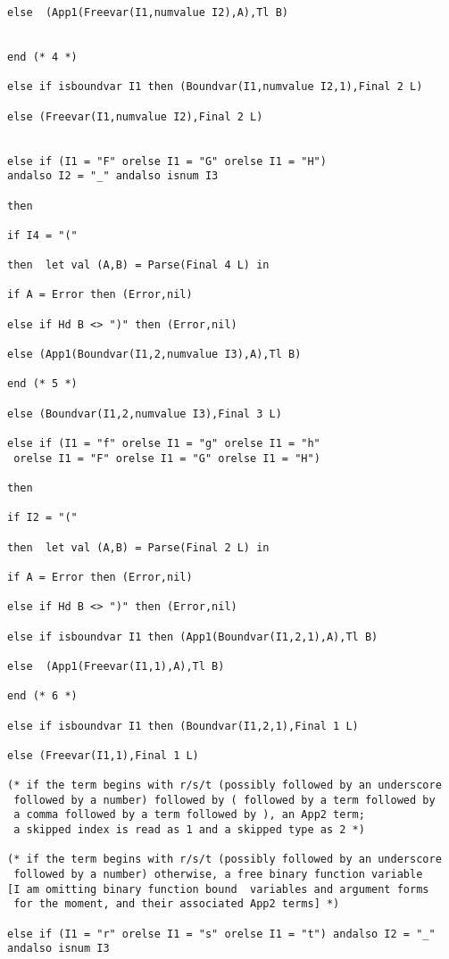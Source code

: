 \documentclass{article}
\begin{document}
{{\begin{verbatim}
else  (App1(Freevar(I1,numvalue I2),A),Tl B)


end (* 4 *)

else if isboundvar I1 then (Boundvar(I1,numvalue I2,1),Final 2 L)

else (Freevar(I1,numvalue I2),Final 2 L)


else if (I1 = "F" orelse I1 = "G" orelse I1 = "H") 
andalso I2 = "_" andalso isnum I3

then

if I4 = "("

then  let val (A,B) = Parse(Final 4 L) in

if A = Error then (Error,nil)

else if Hd B <> ")" then (Error,nil)

else (App1(Boundvar(I1,2,numvalue I3),A),Tl B)

end (* 5 *)

else (Boundvar(I1,2,numvalue I3),Final 3 L)

else if (I1 = "f" orelse I1 = "g" orelse I1 = "h"
 orelse I1 = "F" orelse I1 = "G" orelse I1 = "H")

then

if I2 = "("

then  let val (A,B) = Parse(Final 2 L) in

if A = Error then (Error,nil)

else if Hd B <> ")" then (Error,nil)

else if isboundvar I1 then (App1(Boundvar(I1,2,1),A),Tl B)

else  (App1(Freevar(I1,1),A),Tl B)

end (* 6 *)

else if isboundvar I1 then (Boundvar(I1,2,1),Final 1 L)

else (Freevar(I1,1),Final 1 L)

(* if the term begins with r/s/t (possibly followed by an underscore
 followed by a number) followed by ( followed by a term followed by
 a comma followed by a term followed by ), an App2 term; 
 a skipped index is read as 1 and a skipped type as 2 *)

(* if the term begins with r/s/t (possibly followed by an underscore
 followed by a number) otherwise, a free binary function variable 
[I am omitting binary function bound  variables and argument forms
 for the moment, and their associated App2 terms] *)

else if (I1 = "r" orelse I1 = "s" orelse I1 = "t") andalso I2 = "_" andalso isnum I3


\end{verbatim}}}
\end{document}
